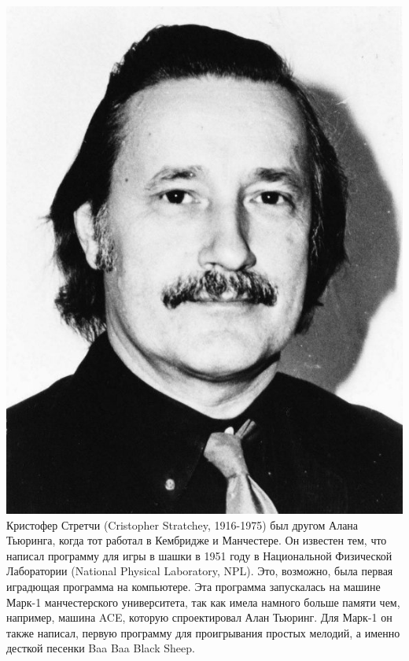 \documentclass[14pt]{matmex-diploma-custom}
\begin{document}
\includegraphics[angle=0,scale=0.2]{stratchey.jpg}
Кристофер Стретчи (Cristopher Stratchey, 1916-1975) был другом Алана Тьюринга, когда тот работал в Кембридже и Манчестере. Он известен тем, что написал программу для игры в шашки в 1951 году в Национальной Физической Лаборатории (National Physical Laboratory, NPL). Это, возможно, была первая иградющая программа на компьютере. Эта программа запускалась на машине Марк-1 манчестерского университета, так как имела намного больше памяти чем, например, машина ACE, которую спроектировал Алан Тьюринг. Для Марк-1 он также написал, первую программу для проигрывания простых мелодий, а именно десткой песенки Baa Baa Black Sheep.
\end{document}
